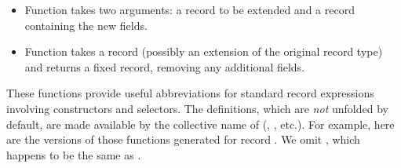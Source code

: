 \begin{isabellebody}
\begin{isamarkuptext}
\begin{itemize}
  \item Function  takes two arguments: a record to be
  extended and a record containing the new fields.

  \item Function  takes a record (possibly an extension
  of the original record type) and returns a fixed record, removing
  any additional fields.

  \end{itemize}
  These functions provide useful abbreviations for standard
  record expressions involving constructors and selectors.  The
  definitions, which are \emph{not} unfolded by default, are made
  available by the collective name of  (, , etc.).
  For example, here are the versions of those functions generated for
  record .  We omit , which happens to
  be the same as .


\end{isamarkuptext}
\end{isabellebody}
